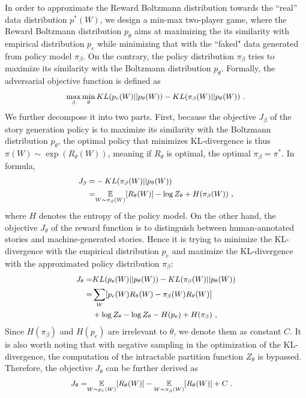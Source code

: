 \documentclass[11pt,a4paper]{article}
\newcommand{\expect}[1]{\ensuremath{\underset{#1}{\mathbb{E}}\xspace}}
\begin{document}
In order to approximate the Reward Boltzmann distribution towards the ``real'' data distribution $p^*(W)$, we design a min-max two-player game, where the Reward Boltzmann distribution $p_{\theta}$ aims at maximizing the its similarity with empirical distribution $p_e$ while minimizing that with the ``faked" data generated from policy model $\pi_{\beta}$. On the contrary, the policy distribution $\pi_{\beta}$ tries to maximize its similarity with the Boltzmann distribution $p_{\theta}$. Formally, the adversarial objective function is defined as
\vspace*{-1ex}
\begin{align}
\small
\begin{split}
\max_{\beta} \min_{\theta} KL(p_e(W)||p_{\theta}(W)) - KL(\pi_{\beta}(W)||p_{\theta}(W)) ~.
\end{split}
\end{align}
We further decompose it into two parts. First, because the objective $J_{\beta}$ of the story generation policy is to maximize its similarity with the Boltzmann distribution $p_{\theta}$, the optimal policy that minimizes KL-divergence is thus $\pi(W) \sim \exp(R_{\theta}(W))$, meaning if $R_{\theta}$ is optimal, the optimal $\pi_{\beta} = \pi^*$. In formula, 
\begin{align} 
\small
\begin{split}
J_{\beta}
=& -KL(\pi_{\beta}(W)||p_{\theta}(W)) \\
=& \expect{W \sim \pi_{\beta}(W)} [R_{\theta}(W)] - \log Z_\theta + H(\pi_{\beta}(W)) ~,
\end{split}
\end{align}
where $H$ denotes the entropy of the policy model. On the other hand, the objective $J_{\theta}$ of the reward function is to distinguish between human-annotated stories and machine-generated stories. Hence it is trying to minimize the KL-divergence with the empirical distribution $p_e$ and maximize the KL-divergence with the approximated policy distribution $\pi_{\beta}$:
\begin{align} 
\small
\begin{split}
J_{\theta}
=& KL(p_e(W)||p_{\theta}(W)) - KL(\pi_{\beta}(W)||p_{\theta}(W)) \\
=&\sum_{W} [p_e(W) R_{\theta}(W) - \pi_{\beta}(W) R_{\theta}(W)] \\
 & + \log Z_\theta - \log Z_\theta - H(p_e) + H(\pi_{\beta}) ~,
\end{split}
\end{align}
Since $H(\pi_{\beta})$ and $H(p_e)$ are irrelevant to $\theta$, we denote them as constant $C$. It is also worth noting that with negative sampling in the optimization of the KL-divergence, the computation of the intractable partition function $Z_{\theta}$ is bypassed. Therefore, the objective $J_{\theta}$ can be further derived as
\begin{align} 
\small
\begin{split}
J_{\theta}
=& \expect{W \sim p_e(W)}[R_{\theta}(W)] - \expect{W \sim \pi_{\beta}(W)}[R_{\theta}(W)] + C ~.
\end{split}
\end{align}
\end{document}
